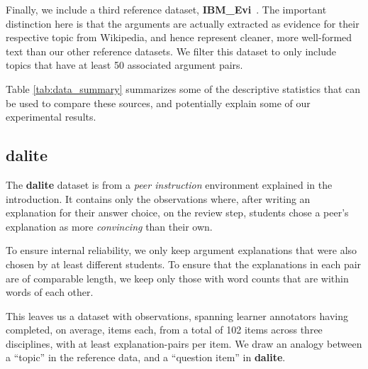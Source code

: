 \documentclass[runningheads]{llncs}
\begin{document}
Finally, we include a third reference dataset, 
\textbf{IBM\_Evi}~\cite{gleize_are_2019}. 
The important distinction here is that the arguments are actually extracted as 
evidence for their respective topic from Wikipedia, and hence represent 
cleaner, more well-formed text than our other reference datasets. 
We filter this dataset to only include topics that have at least 50 associated 
argument pairs.

Table \ref{tab:data_summary} summarizes some of the descriptive statistics that 
can be used to compare these sources, and potentially explain some of our 
experimental results. 

\begin{table}
	\caption{Descriptive statistics for each dataset of argument pairs, with 
		last rows showing \textbf{dalite} data split by discipline. 
		$N_{\mathrm{args}}$ 
		is the number of individual arguments, distributed across $N_{\mathrm{pairs}}$ 
		revolving around $N_{\mathrm{topics}}$. $N_{\mathrm{vocab}}$ is the number of unique 
		tokens in all the arguments. $\overline{wc}$ is the average number of 
		words per argument, shown with the standard deviation $(SD)$. 
		$\overline{\Delta wc}$ is the average relative difference in number of 
		words for each argument in each pair.%
		}
	\centerline{}
	\label{tab:data_summary}
\end{table}


\subsection{dalite}
The \textbf{dalite} dataset is from a \textit{peer instruction} environment 
explained in the introduction.
It contains only the observations where, after writing an explanation for their 
answer choice, on the review step, students chose a peer's explanation as more 
\textit{convincing} than their own.  

To ensure internal reliability, we only keep argument explanations that were 
also chosen by at least different 
students. 
To ensure that the explanations in each pair are of comparable length, we keep 
only those with word counts that are within 
words of each other. 

This leaves us a dataset with observations, 
spanning  learner annotators having 
completed, on average, 
 items each, from a total of 
%
102 items across three disciplines, 
with at least 
explanation-pairs 
per item.
We draw an analogy between a ``topic'' in the reference data, and a 
``question item'' in \textbf{dalite}.
\end{document}
